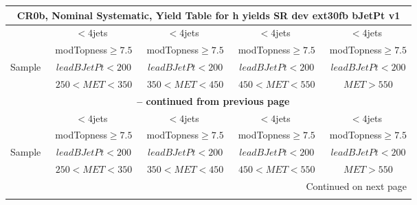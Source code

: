 \documentclass{article}
\begin{document}
 
 
 
 
\pagebreak 

 
 
 
 
\begin{longtable}{|l|c|c|c|c|} 
 
\multicolumn{5}{c}{ CR0b, Nominal Systematic, Yield Table for h yields SR dev ext30fb bJetPt v1 }\\* \hline 
  & $<4$jets  & $<4$jets  & $<4$jets  & $<4$jets \\* 
  & ~modTopness$\ge7.5$  & ~modTopness$\ge7.5$  & ~modTopness$\ge7.5$  & ~modTopness$\ge7.5$ \\* 
Sample  & ~$leadBJetPt<200$  & ~$leadBJetPt<200$  & ~$leadBJetPt<200$  & ~$leadBJetPt<200$ \\* 
  & ~$250<MET<350$  & ~$350<MET<450$  & ~$450<MET<550$  & ~$MET>550$ \\* 
\hline \hline 
\endfirsthead 
 
\multicolumn{5}{c}{{\bfseries \tablename\ \thetable{} -- continued from previous page}}\\* \hline 
  & $<4$jets  & $<4$jets  & $<4$jets  & $<4$jets \\* 
  & ~modTopness$\ge7.5$  & ~modTopness$\ge7.5$  & ~modTopness$\ge7.5$  & ~modTopness$\ge7.5$ \\* 
Sample  & ~$leadBJetPt<200$  & ~$leadBJetPt<200$  & ~$leadBJetPt<200$  & ~$leadBJetPt<200$ \\* 
  & ~$250<MET<350$  & ~$350<MET<450$  & ~$450<MET<550$  & ~$MET>550$ \\* 
\hline \hline 
\endhead 
 
\multicolumn{5}{|r|}{{Continued on next page}}\\* \hline 
\endfoot 
 
 
\endlastfoot 
 

\end{longtable}
\end{document}
